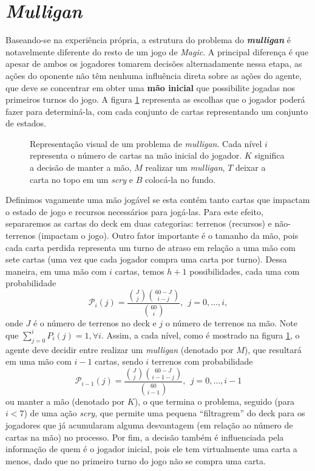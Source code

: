 \documentclass{book}
\begin{document}
\section{\textit{Mulligan}}
Baseando-se na experiência própria, a estrutura do problema do
\textbf{\textit{mulligan}} é notavelmente diferente do resto de um jogo
de \textit{Magic}.
A principal diferença é que apesar de ambos os jogadores tomarem
decisões alternadamente nessa etapa, as ações do oponente não têm
nenhuma influência
direta sobre as ações do agente, que deve se concentrar em obter uma
\textbf{mão inicial} que possibilite jogadas nos primeiros turnos do
jogo.
A figura \ref{mulligan} representa as escolhas que o jogador poderá
fazer para determiná-la, com cada conjunto de cartas representando um
conjunto
de estados.

\begin{figure}
  \centering
  \label{mulligan}
  
  \caption{Representação visual de um problema de \textit{mulligan}. Cada
nível $i$ representa o número de cartas na mão inicial do jogador. $K$ significa a decisão de manter a mão, $M$ realizar um \textit{mulligan}, $T$ deixar a carta no topo em um \textit{scry} e $B$ colocá-la no fundo.}
\end{figure}

Definimos vagamente uma mão jogável se esta contém tanto cartas que
impactam o estado de jogo e recursos necessários para jogá-las.
Para este efeito, separaremos as cartas do deck em duas categorias:
terrenos (recursos) e não-terrenos (impactam o jogo).
Outro fator importante é o tamanho da mão, pois cada carta perdida
representa um turno de atraso em relação a uma mão com sete cartas (uma
vez que cada jogador compra
uma carta por turno). Dessa maneira, em uma mão com $i$ cartas, temos
$h+1$ possibilidades, cada uma com probabilidade
\begin{equation} \label{eq:stateprob} \mathcal{P}_i(j) =
\frac{\binom{J}{j}\binom{60 - J}{i - j}}{\binom{60}{i}}, \ \
j = 0,\ldots, i, \end{equation} onde $J$ é o número de terrenos no deck
e $j$ o
número de terrenos
na mão. Note que $\sum_{j=0}^{i}P_i(j) = 1, \forall i$. Assim, a cada nível, como é mostrado na figura \ref{mulligan}, o
agente deve decidir entre realizar um \textit{mulligan}
(denotado por $M$), que resultará em uma mão com $i-1$ cartas, sendo $i$
terrenos com probabilidade
 \[ \mathcal{P}_{i - 1}(j) = \frac{\binom{J}{j}\binom{60 - J}{i - 1 -
j}}{\binom{60}{i - 1}}, \ \  j = 0,\ldots, i - 1\]
 ou manter a mão (denotado por $K$), o que termina o problema, seguido
(para $i < 7$) de uma ação \textit{scry}, que permite uma pequena
``filtragrem''
 do deck para os jogadores que já acumularam alguma desvantagem (em
relação ao número de cartas na mão) no processo. Por fim, a decisão
também é influenciada
 pela informação de quem é o jogador inicial, pois ele tem virtualmente
uma carta a menos, dado que no primeiro turno do jogo não se compra uma
carta.
\end{document}
